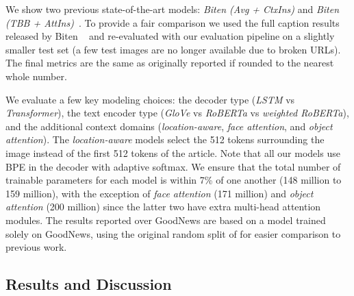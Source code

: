 We show two previous state-of-the-art models: \textit{Biten (Avg + CtxIns)} and
\textit{Biten (TBB + AttIns)}~\cite{Biten2019GoodNews}. To provide a fair
comparison we used the full caption results released by Biten
\etal~\cite{Biten2019GoodNews} and re-evaluated with our evaluation pipeline on
a slightly smaller test set (a few test images are no longer available due to
broken URLs). The final metrics are the same as originally reported if rounded
to the nearest whole number.

We evaluate a few key modeling choices: the decoder type (\textit{LSTM} vs
\textit{Transformer}), the text encoder type (\textit{GloVe} vs
\textit{RoBERTa} vs \textit{weighted RoBERTa}), and the additional context
domains (\textit{location-aware}, \textit{face attention}, and \textit{object
attention}). The \textit{location-aware} models select the 512 tokens
surrounding the image instead of the first 512 tokens of the article. Note that
all our models use BPE in the decoder with adaptive softmax. We ensure that the
total number of trainable parameters for each model is within 7\% of one
another (148 million to 159 million), with the exception of \textit{face
attention} (171 million) and \textit{object attention} (200 million) since the
latter two have extra multi-head attention modules. The results reported over
GoodNews are based on a model trained solely on GoodNews, using the original
random split of \cite{Biten2019GoodNews} for easier comparison to previous work.






\secmoveup
\subsection{Results and Discussion}




